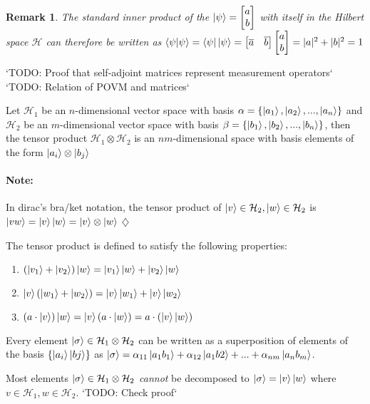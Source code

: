 \documentclass[12pt,twoside,fleqn]{report}
\theoremstyle{thmstyle}
\newtheorem{remark}{Remark}[chapter]
\newenvironment{note}{\paragraph{\textbf{Note:}}}{\hfill\ensuremath{\diamondsuit}}
\begin{document}
\begin{remark}
The standard inner product of the $\ket{\psi} = \begin{bmatrix} a \\ b \end{bmatrix}$ with itself in the Hilbert space $\mathcal{H}$ can therefore be written as $\braket{\psi | \psi} = \bra{\psi}\ket{\psi} = \begin{bmatrix} \overline{a} & \overline{b}\end{bmatrix} \begin{bmatrix} a \\ b \end{bmatrix} = |a|^2 + |b|^2 = 1$
\end{remark}

`TODO: Proof that self-adjoint matrices represent measurement operators`
`TODO: Relation of POVM and matrices`

Let $\mathcal{H}_1$ be an $n$-dimensional vector space with basis $\alpha = \{ \ket{a_1}, \ket{a_2}, ..., \ket{a_n} \}$ and $\mathcal{H}_2$ be an $m$-dimensional vector space with basis $\beta = \{ \ket{b_1}, \ket{b_2}, ..., \ket{b_n} \}$, then the tensor product $\mathcal{H}_1 \otimes \mathcal{H}_2$ is an $nm$-dimensional space with basis elements of the form $\ket{a_i} \otimes \ket{b_j}$

\begin{note}
    In dirac's bra/ket notation, the tensor product of $\ket{v} \in \mathcal{H}_2, \ket{w} \in \mathcal{H}_2$ is $\ket{vw} = \ket{v}\ket{w} = \ket{v} \otimes \ket{w}$
\end{note}

The tensor product is defined to satisfy the following properties:
\begin{enumerate}
    \item $(\ket{v_1} + \ket{v_2} ) \ket{w} = \ket{v_1}\ket{w} + \ket{v_2}\ket{w}$
    \item $\ket{v}(\ket{w_1} + \ket{w_2}) =  \ket{v}\ket{w_1} + \ket{v}\ket{w_2}$
    \item $(a \cdot \ket{v})\ket{w} = \ket{v}(a \cdot \ket{w})  = a \cdot (\ket{v}\ket{w})$
\end{enumerate}
Every element $\ket{\sigma} \in \mathcal{H}_1 \otimes \mathcal{H}_2$ can be written as a superposition of elements of the basis $\{ \ket{a_i}\ket{bj} \}$ as $\ket{\sigma} = \alpha_{11} \ket{a_1 b_1} + \alpha_{12} \ket{a_1 b2} + ... + \alpha_{nm} \ket{a_n b_m}$.

Most elements $\ket{\sigma} \in \mathcal{H}_1 \otimes \mathcal{H}_2$ \textit{cannot} be decomposed to $\ket{\sigma} = \ket{v}\ket{w}$ where $v \in \mathcal{H}_1, w \in \mathcal{H}_2$.
`TODO: Check proof`
\end{document}
